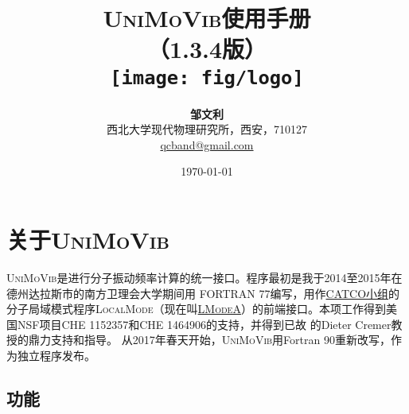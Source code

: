 \documentclass[12pt,a4paper,openany,twoside,cap,UTF8]{ctexbook}
\begin{document}

\title{
\vspace{-3cm}
\hei\textsc{UniMoVib}使用手册  \\
\vspace{1cm} （1.3.4版）\vspace{30 mm} \\
\texttt{[image: fig/logo]} \vspace{30 mm}}

\author{
\textbf{邹文利} \\ \vspace{5mm}
西北大学现代物理研究所，西安，710127 \\ \vspace{5mm}
\href{mailto:qcband@gmail.com}{qcband@gmail.com}
}

\date{\vspace{1cm}  \today}
\maketitle

\setcounter{page}{1}   %
\renewcommand\contentsname{目\qquad 录}
\makeatletter
\let\ps@plain\ps@empty
\makeatother
\tableofcontents            %

\mainmatter
\chapter{关于\textsc{UniMoVib}}
\label{part:about}

\textsc{UniMoVib}是进行分子振动频率计算的统一接口。程序最初是我于2014至2015年在德州达拉斯市的南方卫理会大学期间用 FORTRAN 77编写，用作\href{https://sites.smu.edu/dedman/catco/}{CATCO小组}的分子局域模式程序\textsc{LocalMode}（现在叫\href{https://github.com/catco-smu}{\textsc{LModeA}}）的前端接口。本项工作得到美国NSF项目CHE 1152357和CHE 1464906的支持，并得到已故 的Dieter Cremer教授的鼎力支持和指导。
从2017年春天开始，\textsc{UniMoVib}用Fortran 90重新改写，作为独立程序发布。

\section{功能} \label{sec:feature}
\end{document}
